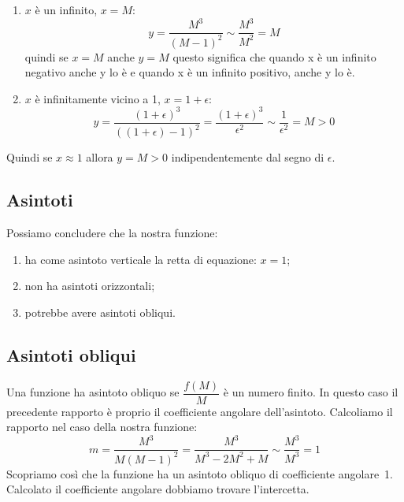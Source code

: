 \begin{minipage}{.60\linewidth}

\begin{enumerate} [nosep]
 \item \(x\) è un infinito, \(x=M\):
 \[y=\frac{M^3}{(M-1)^2} \sim \frac{M^3}{M^2} = M\]
 quindi se \(x=M\) anche \(y=M\) questo significa che quando x è un infinito 
negativo anche y lo è e quando x è un infinito positivo, anche y lo è.
 \item \(x\) è infinitamente vicino a 1, \(x=1+\epsilon\):\
\[y=\frac{(1+\epsilon)^3}{((1+\epsilon)-1)^2}=
    \frac{(1+\epsilon)^3}{\epsilon^2} \sim \frac{1}{\epsilon^2} = M > 0\]
\end{enumerate}
\end{minipage}
\hfill
\begin{minipage}{.38\linewidth}
 \begin{center}
\asintoticofunzionea
 \end{center}
\end{minipage}

Quindi se \(x \approx 1\) allora \(y=M>0\) indipendentemente dal segno di 
\(\epsilon\).

\subsection{Asintoti}

Possiamo concludere che la nostra funzione:

\begin{enumerate} [nosep]
 \item ha come asintoto verticale la retta di equazione: \(x=1\);
 \item non ha asintoti orizzontali;
 \item potrebbe avere asintoti obliqui.
\end{enumerate}

\subsection{Asintoti obliqui}

Una funzione ha asintoto obliquo se \(\dfrac{f(M)}{M}\) è un numero finito. 
In questo caso il precedente rapporto è proprio il coefficiente angolare 
dell'asintoto. Calcoliamo il rapporto nel caso della nostra funzione:
\[m=\frac{M^3}{M(M-1)^2} = \frac{M^3}{M^3 -2M^2 +M} \sim \frac{M^3}{M^3} = 1\]
Scopriamo così che la funzione ha un asintoto obliquo di coefficiente 
angolare~1.
Calcolato il coefficiente angolare dobbiamo trovare l'intercetta.

